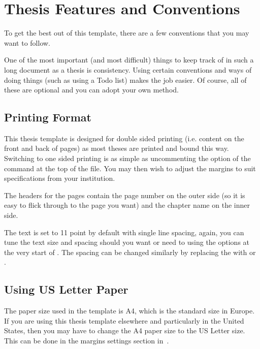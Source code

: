 
\section{Thesis Features and Conventions}\label{ThesisConventions}

To get the best out of this template, there are a few conventions that you may want to follow.

One of the most important (and most difficult) things to keep track of in such a long document as a thesis is consistency. Using certain conventions and ways of doing things (such as using a Todo list) makes the job easier. Of course, all of these are optional and you can adopt your own method.

\subsection{Printing Format}

This thesis template is designed for double sided printing (i.e. content on the front and back of pages) as most theses are printed and bound this way. Switching to one sided printing is as simple as uncommenting the  option of the  command at the top of the  file. You may then wish to adjust the margins to suit specifications from your institution.

The headers for the pages contain the page number on the outer side (so it is easy to flick through to the page you want) and the chapter name on the inner side.

The text is set to 11 point by default with single line spacing, again, you can tune the text size and spacing should you want or need to using the options at the very start of . The spacing can be changed similarly by replacing the  with  or .

\subsection{Using US Letter Paper}

The paper size used in the template is A4, which is the standard size in Europe. If you are using this thesis template elsewhere and particularly in the United States, then you may have to change the A4 paper size to the US Letter size. This can be done in the margins settings section in~.

